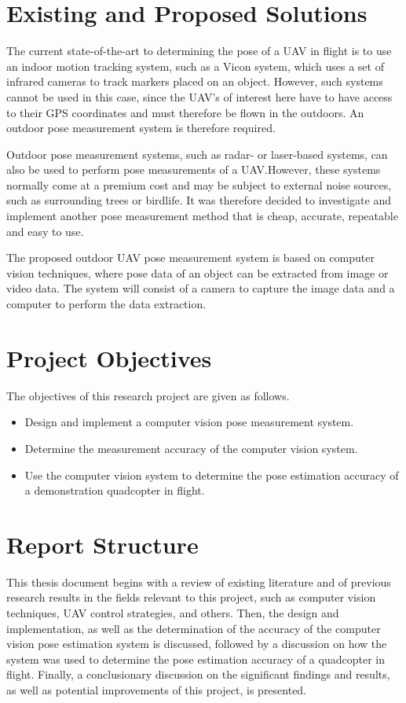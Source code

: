\section{Existing and Proposed Solutions}

The current state-of-the-art to determining the pose of a UAV in flight is to use an indoor motion tracking system, such as a Vicon system, which uses a set of infrared cameras to track markers placed on an object. However, such systems cannot be used in this case, since the UAV's of interest here have to have access to their GPS coordinates and must therefore be flown in the outdoors. An outdoor pose measurement system is therefore required. 

Outdoor pose measurement systems, such as radar- or laser-based systems, can also be used to perform pose measurements of a UAV.\@ However, these systems normally come at a premium cost and may be subject to external noise sources, such as surrounding trees or birdlife. It was therefore decided to investigate and implement another pose measurement method that is cheap, accurate, repeatable and easy to use. 

The proposed outdoor UAV pose measurement system is based on computer vision techniques, where pose data of an object can be extracted from image or video data. The system will consist of a camera to capture the image data and a computer to perform the data extraction. 

\section{Project Objectives}

The objectives of this research project are given as follows. 

\begin{itemize}
  \item Design and implement a computer vision pose measurement system.
  \item Determine the measurement accuracy of the computer vision system.
  \item Use the computer vision system to determine the pose estimation accuracy of a demonstration quadcopter in flight. 
\end{itemize}

\section{Report Structure}

This thesis document begins with a review of existing literature and of previous research results in the fields relevant to this project, such as computer vision techniques, UAV control strategies, and others. Then, the design and implementation, as well as the determination of the accuracy of the computer vision pose estimation system is discussed, followed by a discussion on how the system was used to determine the pose estimation accuracy of a quadcopter in flight. Finally, a conclusionary discussion on the significant findings and results, as well as potential improvements of this project, is presented. 
